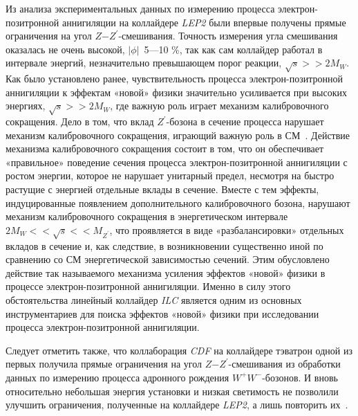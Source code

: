 Из анализа экспериментальных данных по измерению процесса электрон-позитронной аннигиляции на коллайдере \textit{LEP2} были впервые получены прямые ограничения на угол $Z$−$Z^\prime$-смешивания. Точность измерения угла смешивания оказалась не очень высокой, $\left |\phi \right |$~5—10 \%, так как сам коллайдер работал в интервале энергий, незначительно превышающем порог реакции, $\sqrt{s} >> 2M_W$. Как было установлено ранее, чувствительность процесса электрон-позитронной аннигиляции к эффектам «новой» физики значительно усиливается при высоких энергиях, $\sqrt{s} >> 2M_W$, где важную роль играет механизм калибровочного сокращения. Дело в том, что вклад $Z^\prime$-бозона в сечение процесса нарушает механизм калибровочного сокращения, играющий важную роль в СМ~\cite{andreev-ee:2012}. Действие механизма калибровочного сокращения состоит в том, что он обеспечивает «правильное» поведение сечения процесса электрон-позитронной аннигиляции с ростом энергии, которое не нарушает унитарный предел, несмотря на быстро растущие с энергией отдельные вклады в сечение. Вместе с тем эффекты, индуцированные появлением дополнительного калибровочного бозона, нарушают механизм калибровочного сокращения в энергетическом интервале $2M_W << \sqrt{s} << M_{Z^\prime}$, что проявляется в виде «разбалансировки» отдельных вкладов в сечение и, как следствие, в возникновении существенно иной по сравнению со СМ энергетической зависимостью сечений. Этим обусловлено действие так называемого механизма усиления эффектов «новой» физики в процессе электрон-позитронной аннигиляции. Именно в силу этого обстоятельства линейный коллайдер \textit{ILC} является одним из основных инструментариев для поиска эффектов «новой» физики при исследовании процесса электрон-позитронной аннигиляции.

Следует отметить также, что коллаборация \textit{CDF} на коллайдере тэватрон одной из первых получила прямые ограничения на угол $Z$−$Z^\prime$-смешивания из обработки данных по измерению процесса адронного рождения $W^+W^−$-бозонов. И вновь относительно небольшая энергия установки и низкая светимость не позволили улучшить ограничения, полученные на коллайдере \textit{LEP2}, а лишь повторить их~\cite{ada-wwz:2013}.

